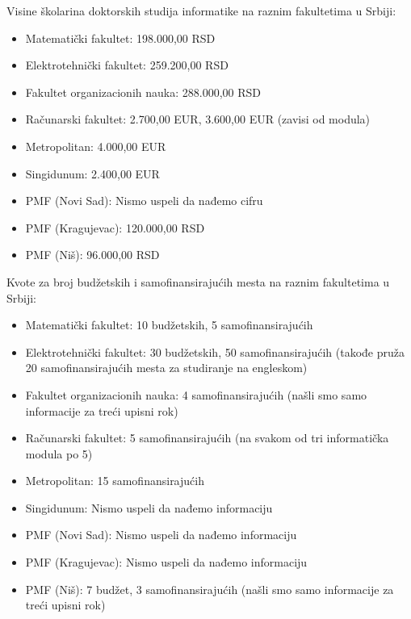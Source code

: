 \documentclass[a4paper]{article}
\begin{document}
Visine školarina doktorskih studija informatike na raznim fakultetima u Srbiji: 
\begin{itemize} 
\item
Matematički fakultet: 198.000,00 RSD \cite{konkursMATF}
\item
Elektrotehnički fakultet: 259.200,00 RSD \cite{konkursETF}
\item
Fakultet organizacionih nauka: 288.000,00 RSD \cite{konkursFON}
\item
Računarski fakultet: 2.700,00 EUR, 3.600,00 EUR (zavisi od modula) \cite{konkursRAF}
\item
Metropolitan: 4.000,00 EUR \cite{konkursMetropolitan}
\item
Singidunum: 2.400,00 EUR \cite{konkursSingidunum}
\item
PMF (Novi Sad): Nismo uspeli da nađemo cifru \cite{konkursNoviSad}
\item
PMF (Kragujevac): 120.000,00 RSD \cite{konkursKragujevac}
\item
PMF (Niš): 96.000,00 RSD \cite{konkursNis}

\end{itemize}

\newpage

Kvote za broj budžetskih i samofinansirajućih mesta na raznim fakultetima u Srbiji: 
\begin{itemize}
\item
Matematički fakultet: 10 budžetskih, 5 samofinansirajućih
\item
Elektrotehnički fakultet: 30 budžetskih, 50 samofinansirajućih (takođe pruža 20 samofinansirajućih mesta za studiranje na engleskom)
\item
Fakultet organizacionih nauka: 4 samofinansirajućih (našli smo samo informacije za treći upisni rok)
\item
Računarski fakultet: 5 samofinansirajućih (na svakom od tri informatička modula po 5)
\item
Metropolitan: 15 samofinansirajućih
\item
Singidunum: Nismo uspeli da nađemo informaciju
\item
PMF (Novi Sad): Nismo uspeli da nađemo informaciju
\item
PMF (Kragujevac): Nismo uspeli da nađemo informaciju
\item
PMF (Niš): 7 budžet, 3 samofinansirajućih (našli smo samo informacije za treći upisni rok)

\end{itemize}
\end{document}
